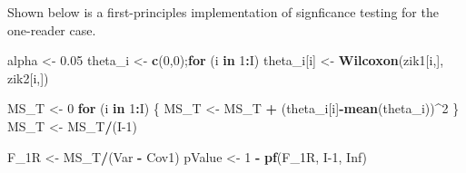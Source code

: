 \documentclass[
]{book}
\newenvironment{Shaded}{\begin{snugshade}}{\end{snugshade}}
\newcommand{\ControlFlowTok}[1]{\textcolor[rgb]{0.13,0.29,0.53}{\textbf{#1}}}
\newcommand{\DecValTok}[1]{\textcolor[rgb]{0.00,0.00,0.81}{#1}}
\newcommand{\FloatTok}[1]{\textcolor[rgb]{0.00,0.00,0.81}{#1}}
\newcommand{\KeywordTok}[1]{\textcolor[rgb]{0.13,0.29,0.53}{\textbf{#1}}}
\newcommand{\NormalTok}[1]{#1}
\newcommand{\OperatorTok}[1]{\textcolor[rgb]{0.81,0.36,0.00}{\textbf{#1}}}
\newcommand{\OtherTok}[1]{\textcolor[rgb]{0.56,0.35,0.01}{#1}}
\newcommand{\StringTok}[1]{\textcolor[rgb]{0.31,0.60,0.02}{#1}}
\begin{document}
Shown below is a first-principles implementation of signficance testing for the one-reader case.

\begin{Shaded}
\begin{Highlighting}[]
\NormalTok{alpha \textless{}{-}}\StringTok{ }\FloatTok{0.05}
\NormalTok{theta\_i \textless{}{-}}\StringTok{ }\KeywordTok{c}\NormalTok{(}\DecValTok{0}\NormalTok{,}\DecValTok{0}\NormalTok{);}\ControlFlowTok{for}\NormalTok{ (i }\ControlFlowTok{in} \DecValTok{1}\OperatorTok{:}\NormalTok{I) theta\_i[i] \textless{}{-}}\StringTok{ }\KeywordTok{Wilcoxon}\NormalTok{(zik1[i,], zik2[i,])}

\NormalTok{MS\_T \textless{}{-}}\StringTok{ }\DecValTok{0}
\ControlFlowTok{for}\NormalTok{ (i }\ControlFlowTok{in} \DecValTok{1}\OperatorTok{:}\NormalTok{I) \{}
\NormalTok{  MS\_T \textless{}{-}}\StringTok{ }\NormalTok{MS\_T }\OperatorTok{+}\StringTok{ }\NormalTok{(theta\_i[i]}\OperatorTok{{-}}\KeywordTok{mean}\NormalTok{(theta\_i))}\OperatorTok{\^{}}\DecValTok{2}
\NormalTok{\}}
\NormalTok{MS\_T \textless{}{-}}\StringTok{ }\NormalTok{MS\_T}\OperatorTok{/}\NormalTok{(I}\DecValTok{{-}1}\NormalTok{)}

\NormalTok{F\_1R \textless{}{-}}\StringTok{ }\NormalTok{MS\_T}\OperatorTok{/}\NormalTok{(Var }\OperatorTok{{-}}\StringTok{ }\NormalTok{Cov1)}
\NormalTok{pValue \textless{}{-}}\StringTok{ }\DecValTok{1} \OperatorTok{{-}}\StringTok{ }\KeywordTok{pf}\NormalTok{(F\_1R, I}\DecValTok{{-}1}\NormalTok{, }\OtherTok{Inf}\NormalTok{)}


\end{Highlighting}
\end{Shaded}
\end{document}
